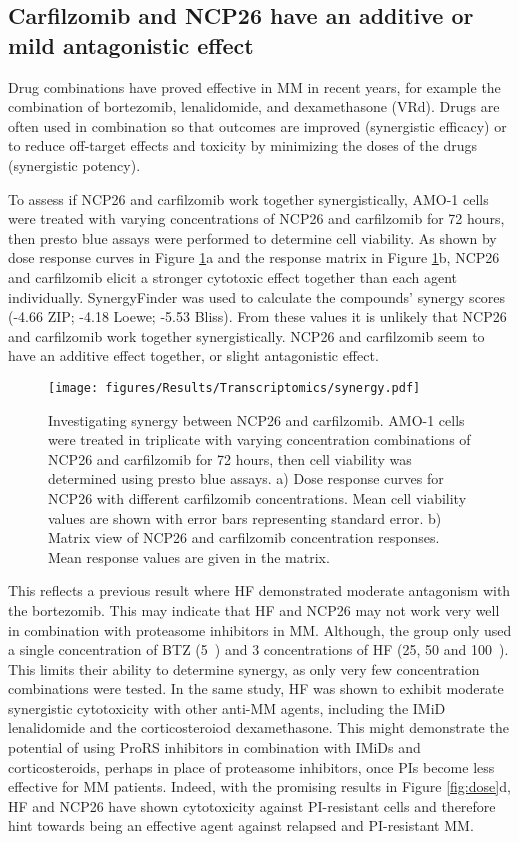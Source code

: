 \subsection{Carfilzomib and NCP26 have an additive or mild antagonistic effect}\label{subsec:synergy}
Drug combinations have proved effective in MM in recent years, for example the combination of bortezomib, lenalidomide, and dexamethasone (VRd).
Drugs are often used in combination so that outcomes are improved (synergistic efficacy) or to reduce off-target effects and toxicity by minimizing the doses of the drugs (synergistic potency)\cite{meyer2019quantifying}.

To assess if NCP26 and carfilzomib work together synergistically, AMO-1 cells were treated with varying concentrations of NCP26 and carfilzomib for 72 hours, then presto blue assays were performed to determine cell viability.
As shown by dose response curves in Figure \ref{fig:synergy}a and the response matrix in Figure \ref{fig:synergy}b, NCP26 and carfilzomib elicit a stronger cytotoxic effect together than each agent individually.
SynergyFinder\cite{zheng2021synergyfinder} was used to calculate the compounds' synergy scores (-4.66 ZIP; -4.18 Loewe; -5.53 Bliss).
From these values it is unlikely that NCP26 and carfilzomib work together synergistically.
NCP26 and carfilzomib seem to have an additive effect together, or slight antagonistic effect.
\begin{figure}[h]
\centering
\texttt{[image: figures/Results/Transcriptomics/synergy.pdf]}
\caption[NCP26 and carfilzomib synergy]{Investigating synergy between NCP26 and carfilzomib.
AMO-1 cells were treated in triplicate with varying concentration combinations of NCP26 and carfilzomib for 72 hours, then cell viability was determined using presto blue assays.
a) Dose response curves for NCP26 with different carfilzomib concentrations.
Mean cell viability values are shown with error bars representing standard error.
b) Matrix view of NCP26 and carfilzomib concentration responses.
Mean response values are given in the matrix.
}
\label{fig:synergy}
\end{figure}
This reflects a previous result where HF demonstrated moderate antagonism with the bortezomib\cite{leiba2012halofuginone}.
This may indicate that HF and NCP26 may not work very well in combination with proteasome inhibitors in MM.
Although, the group only used a single concentration of BTZ (5\si{\nano\Molar}) and 3 concentrations of HF (25, 50 and 100\si{\nano\Molar}).
This limits their ability to determine synergy, as only very few concentration combinations were tested.
In the same study, HF was shown to exhibit moderate synergistic cytotoxicity with other anti-MM agents, including the IMiD lenalidomide and the corticosteroiod dexamethasone.
This might demonstrate the potential of using ProRS inhibitors in combination with IMiDs and corticosteroids, perhaps in place of proteasome inhibitors, once PIs become less effective for MM patients.
Indeed, with the promising results in Figure \ref{fig:dose}d, HF and NCP26 have shown cytotoxicity against PI-resistant cells and therefore hint towards being an effective agent against relapsed and PI-resistant MM\@.

